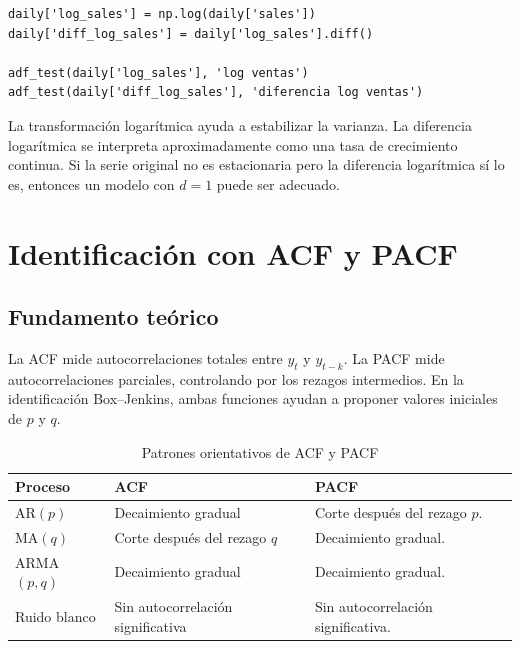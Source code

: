 \documentclass[11pt,letterpaper]{article}
\begin{document}
\begin{lstlisting}[style=pythoncolab]
daily['log_sales'] = np.log(daily['sales'])
daily['diff_log_sales'] = daily['log_sales'].diff()

adf_test(daily['log_sales'], 'log ventas')
adf_test(daily['diff_log_sales'], 'diferencia log ventas')
\end{lstlisting}

\begin{interpretacion}
La transformación logarítmica ayuda a estabilizar la varianza. La diferencia logarítmica se interpreta aproximadamente como una tasa de crecimiento continua. Si la serie original no es estacionaria pero la diferencia logarítmica sí lo es, entonces un modelo con \(d=1\) puede ser adecuado.
\end{interpretacion}

\section{Identificación con ACF y PACF}

\subsection{Fundamento teórico}

\begin{markdowncell}
La ACF mide autocorrelaciones totales entre \(y_t\) y \(y_{t-k}\). La PACF mide autocorrelaciones parciales, controlando por los rezagos intermedios. En la identificación Box--Jenkins, ambas funciones ayudan a proponer valores iniciales de \(p\) y \(q\).
\end{markdowncell}

\begin{table}[H]
\centering
\caption{Patrones orientativos de ACF y PACF}
\label{tab:acf_pacf}
\begin{tabular}{lll}
\toprule
\textbf{Proceso} & \textbf{ACF} & \textbf{PACF} \\
\midrule
AR\((p)\) & Decaimiento gradual & Corte después del rezago \(p\). \\
MA\((q)\) & Corte después del rezago \(q\) & Decaimiento gradual. \\
ARMA\((p,q)\) & Decaimiento gradual & Decaimiento gradual. \\
Ruido blanco & Sin autocorrelación significativa & Sin autocorrelación significativa. \\
\bottomrule
\end{tabular}
\end{table}
\end{document}
